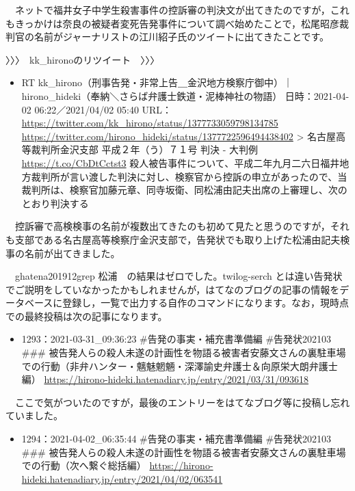 \documentclass[
]{ltjarticle}
\providecommand{\tightlist}{%
  \setlength{\itemsep}{0pt}\setlength{\parskip}{0pt}}
\begin{document}
　ネットで福井女子中学生殺害事件の控訴審の判決文が出てきたのですが，これもきっかけは奈良の被疑者変死告発事件について調べ始めたことで，松尾昭彦裁判官の名前がジャーナリストの江川紹子氏のツイートに出てきたことです。

〉〉〉　kk\_hironoのリツイート　〉〉〉

\begin{itemize}
\tightlist
\item
  RT
  kk\_hirono（刑事告発・非常上告＿金沢地方検察庁御中）｜hirono\_hideki（奉納＼さらば弁護士鉄道・泥棒神社の物語）
  日時：2021-04-02 06:22／2021/04/02 05:40 URL：
  \url{https://twitter.com/kk\_hirono/status/1377733059798134785} 
  \url{https://twitter.com/hirono\_hideki/status/1377722596494438402} 
  \textgreater{} 名古屋高等裁判所金沢支部 平成２年（う）７１号 判決 -
  大判例 \url{https://t.co/CbDtCctst3} 
  殺人被告事件について、平成二年九月二六日福井地方裁判所が言い渡した判決に対し、検察官から控訴の申立があったので、当裁判所は、検察官加藤元章、同寺坂衛、同松浦由記夫出席の上審理し、次のとおり判決する
\end{itemize}

　控訴審で高検検事の名前が複数出てきたのも初めて見たと思うのですが，それも支部である名古屋高等検察庁金沢支部で，告発状でも取り上げた松浦由記夫検事の名前が出てきました。

　ghatena201912\textbar grep 松浦　の結果はゼロでした。twilog-serch
とは違い告発状でご説明をしていなかったかもしれませんが，はてなのブログの記事の情報をデータベースに登録し，一覧で出力する自作のコマンドになります。なお，現時点での最終投稿は次の記事になります。

\begin{itemize}
\tightlist
\item
  1293：2021-03-31\_09:36:23 \#告発の事実・補充書準備編 \#告発状202103
  \#\#\#
  被告発人らの殺人未遂の計画性を物語る被害者安藤文さんの裏駐車場での行動（非弁ハンター・魑魅魍魎・深澤諭史弁護士＆向原栄大朗弁護士編）
  \url{https://hirono-hideki.hatenadiary.jp/entry/2021/03/31/093618} 
\end{itemize}

　ここで気がついたのですが，最後のエントリーをはてなブログ等に投稿し忘れていました。

\begin{itemize}
\tightlist
\item
  1294：2021-04-02\_06:35:44 \#告発の事実・補充書準備編 \#告発状202103
  \#\#\#
  被告発人らの殺人未遂の計画性を物語る被害者安藤文さんの裏駐車場での行動（次へ繋ぐ総括編）
  \url{https://hirono-hideki.hatenadiary.jp/entry/2021/04/02/063541} 
\end{itemize}
\end{document}
